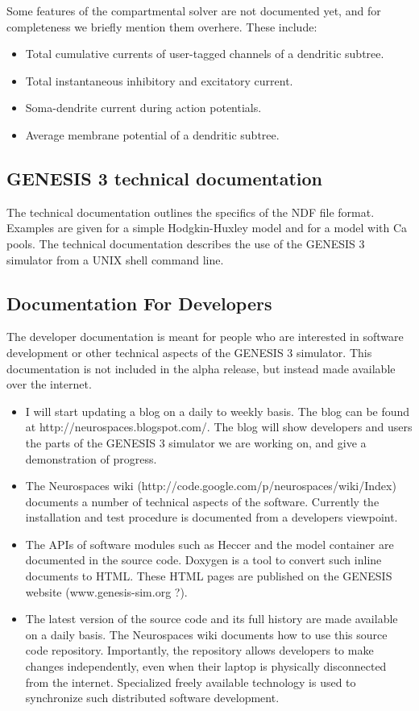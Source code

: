 \documentclass[12pt]{article}
\begin{document}
Some features of the compartmental solver are not documented yet, and
for completeness we briefly mention them overhere.  These include:
\begin{itemize}
\item Total cumulative currents of user-tagged channels of a dendritic
  subtree.
\item Total instantaneous inhibitory and excitatory current.
\item Soma-dendrite current during action potentials.
\item Average membrane potential of a dendritic subtree.
\end{itemize}


\subsection{GENESIS 3 technical documentation}
The technical documentation outlines the specifics of the NDF file
format.  Examples are given for a simple Hodgkin-Huxley model and for
a model with Ca pools.  The technical documentation describes the use
of the GENESIS 3 simulator from a UNIX shell command line.


\subsection{Documentation For Developers}

The developer documentation is meant for people who are interested in
software development or other technical aspects of the GENESIS 3
simulator.  This documentation is not included in the alpha release,
but instead made available over the internet.

\begin{itemize}
\item I will start updating a blog on a daily to weekly basis.  The
  blog can be found at http://neurospaces.blogspot.com/.  The blog
  will show developers and users the parts of the GENESIS 3 simulator
  we are working on, and give a demonstration of progress.
\item The Neurospaces wiki
  (http://code.google.com/p/neurospaces/wiki/Index) documents a number
  of technical aspects of the software.  Currently the installation
  and test procedure is documented from a developers viewpoint.
\item The APIs of software modules such as Heccer and the model
  container are documented in the source code.  Doxygen is a tool to
  convert such inline documents to HTML.  These HTML pages are
  published on the GENESIS website (www.genesis-sim.org ?).
\item The latest version of the source code and its full history are
  made available on a daily basis.  The Neurospaces wiki documents how
  to use this source code repository.  Importantly, the repository
  allows developers to make changes independently, even when their
  laptop is physically disconnected from the internet.  Specialized
  freely available technology is used to synchronize such distributed
  software development.
\end{itemize}
\end{document}
